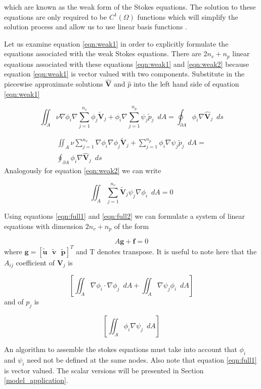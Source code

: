 \documentclass[wrr]{agutex}  %
\begin{document}
\begin{article}
which are known as the weak form of the Stokes equations.  The solution to these equations are only required to be $C^1(\Omega)$ functions which will simplify the solution process and allow us to use linear basis functions \cite{Burkardt2005b}.  

Let us examine equation \ref{eqn:weak1} in order to explicitly formulate the equations associated with the weak Stokes equations.  There are $2n_v+n_p$ linear equations associated with these equations \ref{eqn:weak1} and \ref{eqn:weak2} because equation \ref{eqn:weak1} is vector valued with two components. Substitute in the piecewise approximate solutions $\hat{\mathbf{V}}$ and $\hat{p}$ into the left hand side of equation \ref{eqn:weak1}

$$
  \iint_A \nu \nabla \phi_i \nabla\sum_{j=1}^{n_v}\phi_j\tilde{\mathbf{V}}_j
  + \phi_i\nabla\sum_{j=1}^{n_p}\psi_j\tilde{p}_j\,\,\,dA  = \oint_{\partial A}\phi_i\nabla \hat{\mathbf{V}}_j \,\,\,ds 
$$

\begin{multline}
  \iint_A \nu \sum_{j=1}^{n_v}\nabla \phi_i\nabla\phi_j\tilde{\mathbf{V}}_j
  + \sum_{j=1}^{n_p}\phi_i\nabla\psi_j\tilde{p}_j\,\,\,dA  =\\ \oint_{\partial A}\phi_i\nabla \hat{\mathbf{V}}_j \,\,\,ds \label{eqn:full1}
\end{multline}
Analogously for equation \ref{eqn:weak2} we can write

\begin{equation}
\iint_A\sum_{j=1}^{n_v}\tilde{\mathbf{V}}_j\psi_j\nabla\phi_i\,\,\,dA = 0 \label{eqn:full2}
\end{equation}

Using equations \ref{eqn:full1} and \ref{eqn:full2} we can formulate a system of linear equations with dimension $2n_v+n_p$ of the form 

\begin{equation}
A\mathbf{g}+\mathbf{f} = 0
\end{equation}
where $\mathbf{g}=[\tilde{\mathbf{u}}\,\,\,\,\tilde{\mathbf{v}}\,\,\,\,\tilde{\mathbf{p}}]^T$ and T denotes transpose.  It is useful to note here that the $A_{ij}$ coefficient of $\mathbf{V}_j$ is 

$$\left[\iint_A\nabla \phi_i\cdot\nabla\phi_j\,\,\,dA+\iint_A\nabla\psi_j\phi_i\,\,\,dA\right]$$ 
and of $p_j$ is 

$$\left[\iint_A\phi_i\nabla \psi_j\,\,\,dA\right]$$ 

An algorithm to assemble the stokes equations must take into account that $\phi_i$ and $\psi_i$ need not be defined at the same nodes.  Also note that equation \ref{eqn:full1} is vector valued.  The scalar versions will be presented in Section \ref{model_application}. 


\end{article}
\end{document}
